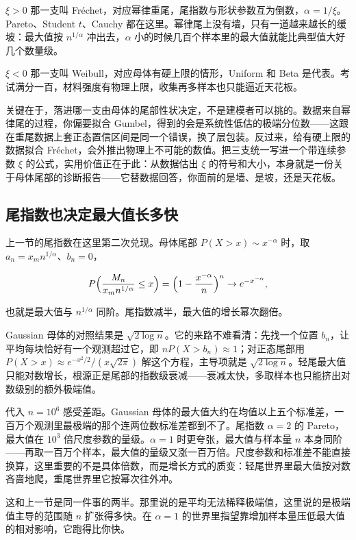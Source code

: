 \(\xi>0\) 那一支叫 Fréchet，对应幂律重尾，尾指数与形状参数互为倒数，\(\alpha=1/\xi\)。Pareto、Student \(t\)、Cauchy 都在这里。幂律尾上没有墙，只有一道越来越长的缓坡：最大值按 \(n^{1/\alpha}\) 冲出去，\(\alpha\) 小的时候几百个样本里的最大值就能比典型值大好几个数量级。

\(\xi<0\) 那一支叫 Weibull，对应母体有硬上限的情形，Uniform 和 Beta 是代表。考试满分一百，材料强度有物理上限，收集再多样本也只能逼近天花板。

关键在于，落进哪一支由母体的尾部性状决定，不是建模者可以挑的。数据来自幂律尾的过程，你偏要拟合 Gumbel，得到的会是系统性低估的极端分位数——这跟在重尾数据上套正态置信区间是同一个错误，换了层包装。反过来，给有硬上限的数据拟合 Fréchet，会外推出物理上不可能的数值。把三支统一写进一个带连续参数 \(\xi\) 的公式，实用价值正在于此：从数据估出 \(\xi\) 的符号和大小，本身就是一份关于母体尾部的诊断报告——它替数据回答，你面前的是墙、是坡，还是天花板。

\subsection{尾指数也决定最大值长多快}

上一节的尾指数在这里第二次兑现。母体尾部 \(P(X>x)\sim x^{-\alpha}\) 时，取 \(a_n=x_mn^{1/\alpha}\)、\(b_n=0\)，

\[
P\Bigl(\frac{M_n}{x_mn^{1/\alpha}}\le x\Bigr)=\Bigl(1-\frac{x^{-\alpha}}{n}\Bigr)^n\to e^{-x^{-\alpha}},
\]

也就是最大值与 \(n^{1/\alpha}\) 同阶。尾指数减半，最大值的增长幂次翻倍。

Gaussian 母体的对照结果是 \(\sqrt{2\log n}\)。它的来路不难看清：先找一个位置 \(b_n\)，让平均每块恰好有一个观测超过它，即 \(nP(X>b_n)\approx1\)；对正态尾部用 \(P(X>x)\approx e^{-x^2/2}/(x\sqrt{2\pi})\) 解这个方程，主导项就是 \(\sqrt{2\log n}\)。轻尾最大值只能对数增长，根源正是尾部的指数级衰减——衰减太快，多取样本也只能挤出对数级别的额外极端值。

代入 \(n=10^6\) 感受差距。Gaussian 母体的最大值大约在均值以上五个标准差，一百万个观测里最极端的那个连两位数标准差都到不了。尾指数 \(\alpha=2\) 的 Pareto，最大值在 \(10^3\) 倍尺度参数的量级。\(\alpha=1\) 时更夸张，最大值与样本量 \(n\) 本身同阶——再取一百万个样本，最大值的量级又涨一百万倍。尺度参数和标准差不能直接换算，这里重要的不是具体倍数，而是增长方式的质变：轻尾世界里最大值按对数吝啬地爬，重尾世界里它按幂次往外冲。

这和上一节是同一件事的两半。那里说的是平均无法稀释极端值，这里说的是极端值主导的范围随 \(n\) 扩张得多快。在 \(\alpha=1\) 的世界里指望靠增加样本量压低最大值的相对影响，它跑得比你快。


